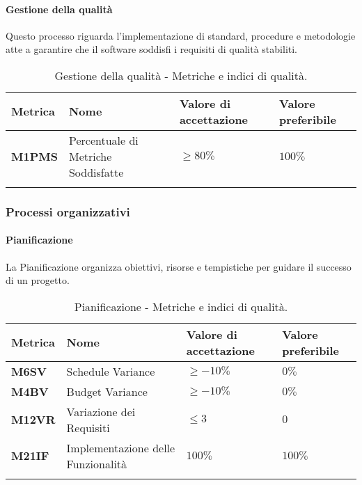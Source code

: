 \paragraph{Gestione della qualità}
Questo processo riguarda l'implementazione di standard, procedure e metodologie atte a garantire che il software soddisfi i requisiti di qualità stabiliti.
\hspace{1pt}
    \begin{longtable}{|C{1.5cm}|L{3cm}|L{2.5cm}|L{2.5cm}|}
        \hline
        \textbf{Metrica} & \textbf{Nome} & \textbf{Valore di accettazione} & \textbf{Valore preferibile} \\
        \hline
        \textbf{M1PMS} & Percentuale di Metriche Soddisfatte & $\geq 80\%$ & $100\%$ \\
        \hline
    \caption{Gestione della qualità - Metriche e indici di qualità.}
    \label{tab:gestione_metriche_testo}
\end{longtable}



\subsubsection{Processi organizzativi}

\paragraph{Pianificazione}
La Pianificazione organizza obiettivi, risorse e tempistiche per guidare il successo di un progetto.

\hspace{1pt}
    \begin{longtable}{|C{1.5cm}|L{3cm}|L{2.5cm}|L{2.5cm}|}
        \hline
        \textbf{Metrica} & \textbf{Nome} & \textbf{Valore di accettazione} & \textbf{Valore preferibile} \\
        \hline
        \textbf{M6SV} & Schedule Variance & $\geq -10\%$ & $0\%$ \\
        \hline
        \textbf{M4BV} & Budget Variance & $\geq -10\%$ & $0\%$ \\
        \hline
        \textbf{M12VR} & Variazione dei Requisiti & $\leq 3$ & $0$ \\
        \hline
        \textbf{M21IF} & Implementazione delle Funzionalità & $ 100\%$ & $ 100\%$ \\
        \hline
    \caption{Pianificazione - Metriche e indici di qualità.}
    \label{tab:metriche_pianificazione}
\end{longtable}

